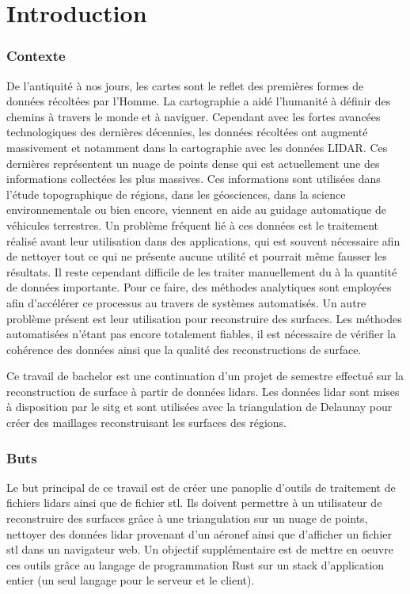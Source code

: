 \chapter*{Introduction}
\subsection*{Contexte}
De l'antiquité à nos jours, les cartes sont le reflet des premières formes de données récoltées par l'Homme.
La cartographie a aidé l'humanité à définir des chemins à travers le monde et à naviguer.
Cependant avec les fortes avancées technologiques des dernières décennies,
les données récoltées ont augmenté massivement et notamment dans la cartographie avec les données LIDAR.
Ces dernières représentent un nuage de points dense qui est actuellement une des informations collectées les plus massives.
Ces informations sont utilisées dans l'étude topographique de régions, dans les géosciences,
dans la science environnementale ou bien encore, viennent en aide au guidage automatique de véhicules terrestres.
Un problème fréquent lié à ces données est le traitement réalisé avant leur
utilisation dans des applications, qui est souvent nécessaire afin de nettoyer
tout ce qui ne présente aucune utilité et pourrait même fausser les résultats.
Il reste cependant difficile de les traiter manuellement du à la quantité de données importante.
Pour ce faire, des méthodes analytiques sont employées afin d'accélérer ce processus au travers de systèmes automatisés.
Un autre problème présent est leur utilisation pour reconstruire des surfaces.
Les méthodes automatisées n'étant pas encore totalement fiables, il est nécessaire de
vérifier la cohérence des données ainsi que la qualité des reconstructions de
surface.

Ce travail de bachelor est une continuation d'un projet de semestre effectué sur
la reconstruction de surface à partir de données lidars. Les données lidar sont mises à disposition par le \gls{sitg} et sont utilisées
avec la triangulation de Delaunay pour créer des maillages reconstruisant les
surfaces des régions.

\subsection*{Buts}
Le but principal de ce travail est de créer une panoplie d'outils de traitement
de fichiers lidars ainsi que de fichier stl. Ils doivent permettre à un
utilisateur de reconstruire des surfaces grâce à une triangulation sur un nuage
de points, nettoyer des données lidar provenant d'un aéronef ainsi que
d'afficher un fichier stl dans un navigateur web. Un objectif supplémentaire est
de mettre en oeuvre ces outils grâce au langage de programmation Rust sur un
stack d'application entier (un seul langage pour le serveur et le client).

